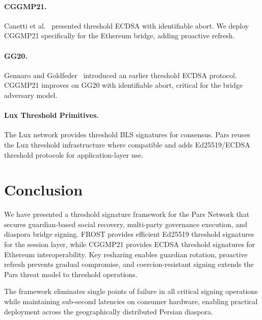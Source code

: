 \documentclass[11pt,a4paper]{article}
\begin{document}
\paragraph{CGGMP21.}  Canetti et al.~\cite{canetti2021cggmp} presented
threshold ECDSA with identifiable abort.  We deploy CGGMP21 specifically
for the Ethereum bridge, adding proactive refresh.

\paragraph{GG20.}  Gennaro and Goldfeder~\cite{gennaro2020gg20}
introduced an earlier threshold ECDSA protocol.  CGGMP21 improves on
GG20 with identifiable abort, critical for the bridge adversary model.

\paragraph{Lux Threshold Primitives.}  The Lux network provides
threshold BLS signatures for consensus.  Pars reuses the Lux threshold
infrastructure where compatible and adds Ed25519/ECDSA threshold
protocols for application-layer use.

\section{Conclusion}
\label{sec:conclusion}

We have presented a threshold signature framework for the Pars Network
that secures guardian-based social recovery, multi-party governance
execution, and diaspora bridge signing.  FROST provides efficient
Ed25519 threshold signatures for the session layer, while CGGMP21
provides ECDSA threshold signatures for Ethereum interoperability.
Key resharing enables guardian rotation, proactive refresh prevents
gradual compromise, and coercion-resistant signing extends the Pars
threat model to threshold operations.

The framework eliminates single points of failure in all critical
signing operations while maintaining sub-second latencies on consumer
hardware, enabling practical deployment across the geographically
distributed Persian diaspora.
\end{document}
